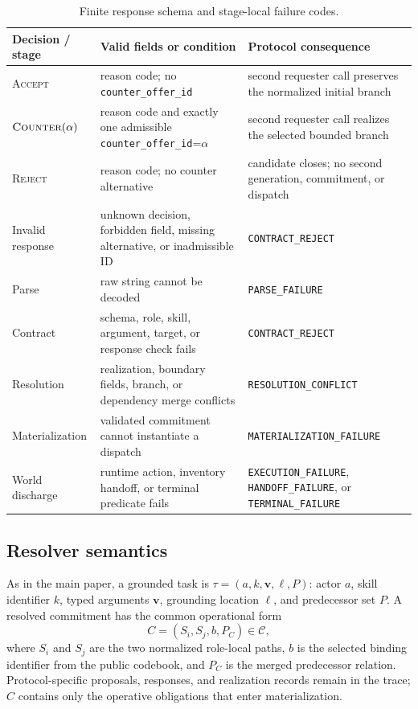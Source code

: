\documentclass[10pt]{article}
\newcommand{\tabstyle}{\small\setlength{\tabcolsep}{2.5pt}\renewcommand{\arraystretch}{1.10}}
\newcommand{\thead}[1]{\textbf{#1}}
\newcommand{\artifact}[1]{\texttt{#1}}
\begin{document}
\begin{table}[!htbp]
  \centering
  \caption{Finite response schema and stage-local failure codes.}
  \label{tab:response-schema}
  \tabstyle
  \begin{tabularx}{\textwidth}{L{2.45cm} Z Z}
    \toprule
    \thead{Decision / stage} & \thead{Valid fields or condition} & \thead{Protocol consequence} \\
    \midrule
    \textsc{Accept} & reason code; no \artifact{counter\_offer\_id} & second requester call preserves the normalized initial branch \\
    $\textsc{Counter}(\alpha)$ & reason code and exactly one admissible \artifact{counter\_offer\_id}=$\alpha$ & second requester call realizes the selected bounded branch \\
    \textsc{Reject} & reason code; no counter alternative & candidate closes; no second generation, commitment, or dispatch \\
    Invalid response & unknown decision, forbidden field, missing alternative, or inadmissible ID & \artifact{CONTRACT\_REJECT} \\
    \midrule
    Parse & raw string cannot be decoded & \artifact{PARSE\_FAILURE} \\
    Contract & schema, role, skill, argument, target, or response check fails & \artifact{CONTRACT\_REJECT} \\
    Resolution & realization, boundary fields, branch, or dependency merge conflicts & \artifact{RESOLUTION\_CONFLICT} \\
    Materialization & validated commitment cannot instantiate a dispatch & \artifact{MATERIALIZATION\_FAILURE} \\
    World discharge & runtime action, inventory handoff, or terminal predicate fails & \artifact{EXECUTION\_FAILURE}, \artifact{HANDOFF\_FAILURE}, or \artifact{TERMINAL\_FAILURE} \\
    \bottomrule
  \end{tabularx}
\end{table}

\subsection{Resolver semantics}

As in the main paper, a grounded task is $\tau=(a,k,\mathbf v,\ell,P)$: actor $a$, skill identifier $k$, typed arguments $\mathbf v$, grounding location $\ell$, and predecessor set $P$. A resolved commitment has the common operational form
\[
C=(S_i,S_j,b,P_C)\in\mathcal C,
\]
where $S_i$ and $S_j$ are the two normalized role-local paths, $b$ is the selected binding identifier from the public codebook, and $P_C$ is the merged predecessor relation. Protocol-specific proposals, responses, and realization records remain in the trace; $C$ contains only the operative obligations that enter materialization.
\end{document}

